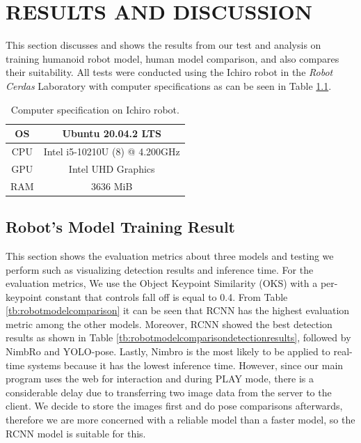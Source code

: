 \chapter{RESULTS AND DISCUSSION}
\label{chap:resultsandiscussion}


This section discusses and shows the results from our test and analysis on training humanoid robot model, human model comparison, and also compares their suitability.
All tests were conducted using the Ichiro robot in the \emph{Robot Cerdas} Laboratory with computer specifications as can be seen in Table \ref{tb:computerspecichiro}.

\begin{longtable}{|c|c|}
  \caption{Computer specification on Ichiro robot.}
  \label{tb:computerspecichiro}\\
  \hline
  OS      & Ubuntu 20.04.2 LTS \\
  \hline
  CPU     & Intel i5-10210U (8) @ 4.200GHz \\
  \hline
  GPU     & Intel UHD Graphics  \\
  \hline
  RAM     & 3636 MiB \\
  \hline
\end{longtable}

\section{Robot's Model Training Result}
\label{sec:robotmodeltrainingresult}

This section shows the evaluation metrics about three models and testing we perform such as visualizing detection results and inference time.
For the evaluation metrics, We use the Object Keypoint Similarity (OKS) with a per-keypoint constant that controls fall off is equal to 0.4.
From Table \ref{tb:robotmodelcomparison} it can be seen that RCNN has the highest evaluation metric among the other models.
Moreover, RCNN showed the best detection results as shown in Table \ref{tb:robotmodelcomparisondetectionresults}, followed by NimbRo and YOLO-pose.
Lastly, Nimbro is the most likely to be applied to real-time systems because it has the lowest inference time.
However, since our main program uses the web for interaction and during PLAY mode, there is a considerable delay due to transferring two image data from the server to the client.
We decide to store the images first and do pose comparisons afterwards,
therefore we are more concerned with a reliable model than a faster model, so the RCNN model is suitable for this.


